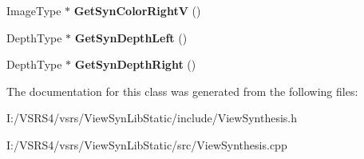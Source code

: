 \begin{DoxyCompactItemize}
Image\+Type $\ast$ {\bfseries Get\+Syn\+Color\+RightV} ()
\item 
\mbox{\label{class_c_view_interpolation_general_a9071eb7a3dc4ce1c4eaf75c7a25cd08f}} 
Depth\+Type $\ast$ {\bfseries Get\+Syn\+Depth\+Left} ()
\item 
\mbox{\label{class_c_view_interpolation_general_a94e264bc7f9fbfa52967a3399e8ae122}} 
Depth\+Type $\ast$ {\bfseries Get\+Syn\+Depth\+Right} ()
\end{DoxyCompactItemize}


The documentation for this class was generated from the following files\+:\begin{DoxyCompactItemize}
\item 
I\+:/\+V\+S\+R\+S4/vsrs/\+View\+Syn\+Lib\+Static/include/View\+Synthesis.\+h\item 
I\+:/\+V\+S\+R\+S4/vsrs/\+View\+Syn\+Lib\+Static/src/View\+Synthesis.\+cpp\end{DoxyCompactItemize}

